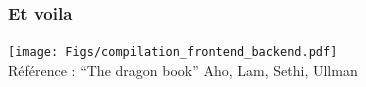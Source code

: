 \documentclass{beamer}
\begin{document}
\begin{frame}
\frametitle{Et voila}


\texttt{[image: Figs/compilation\_frontend\_backend.pdf]}\\
\vfill
Référence : ``The dragon book'' Aho, Lam, Sethi, Ullman

\end{frame}




\end{document}
